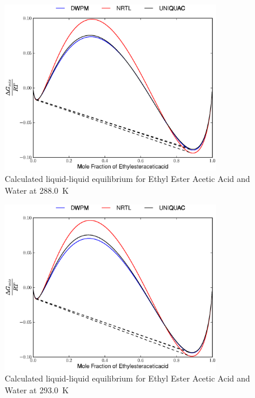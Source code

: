 \begin{figure}[hp]
\centering
\includegraphics[width = 0.85\textwidth]{Results_Parts/BinaryParams/ethylesteraceticacid-water/AllModelsGibbsPlots/T_288.0.eps}
\caption{Calculated liquid-liquid equilibrium for Ethyl Ester Acetic Acid and Water at 288.0~$\mathrm{K}$}
\end{figure}

\begin{figure}[hp]
\centering
\includegraphics[width = 0.85\textwidth]{Results_Parts/BinaryParams/ethylesteraceticacid-water/AllModelsGibbsPlots/T_293.0.eps}
\caption{Calculated liquid-liquid equilibrium for Ethyl Ester Acetic Acid and Water at 293.0~$\mathrm{K}$}
\end{figure}

